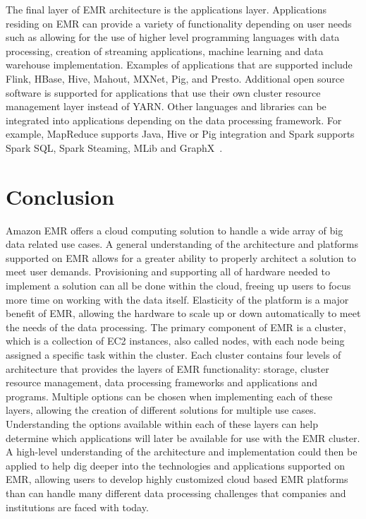 The final layer of EMR architecture is the applications layer. Applications 
residing on EMR can provide a variety of functionality depending on user 
needs such as allowing for the use of higher level programming languages 
with data processing, creation of streaming applications, machine learning 
and data warehouse implementation. Examples of applications that are supported 
include Flink, HBase, Hive, Mahout, MXNet, Pig, and Presto. Additional open 
source software is supported for applications that use their own cluster 
resource management layer instead of YARN. Other languages and libraries can 
be integrated into applications depending on the data processing framework. 
For example, MapReduce supports Java, Hive or Pig integration and Spark 
supports Spark SQL, Spark Steaming, MLib and 
GraphX~\cite{hid-sp18-521-amazonemr-arch}.  

\section{Conclusion}

Amazon EMR offers a cloud computing solution to handle a wide array of big 
data related use cases. A general understanding of the architecture and 
platforms supported on EMR allows for a greater ability to properly architect 
a solution to meet user demands. Provisioning and supporting all of hardware 
needed to implement a solution can all be done within the cloud, freeing up 
users to focus more time on working with the data itself. Elasticity of the 
platform is a major benefit of EMR, allowing the hardware to scale up or down 
automatically to meet the needs of the data processing. The primary component 
of EMR is a cluster, which is a collection of EC2 instances, also called 
nodes, with each node being assigned a specific task within the cluster. 
Each cluster contains four levels of architecture that provides the layers 
of EMR functionality: storage, cluster resource management, data processing 
frameworks and applications and programs. Multiple options can be chosen when 
implementing each of these layers, allowing the creation of different 
solutions for multiple use cases. Understanding the options available within 
each of these layers can help determine which applications will later be 
available for use with the EMR cluster. A high-level understanding of the 
architecture and implementation could then be applied to help dig deeper into 
the technologies and applications supported on EMR, allowing users to develop 
highly customized cloud based EMR platforms than can handle many different 
data processing challenges that companies and institutions are faced with 
today. 



 

